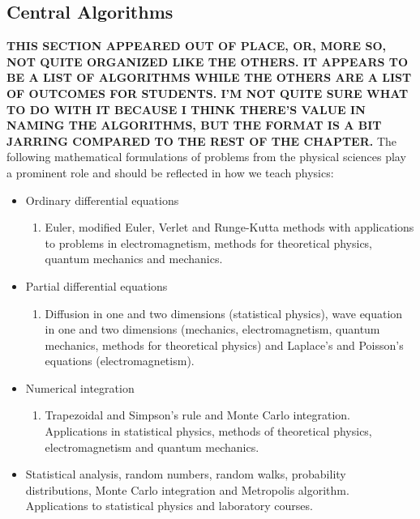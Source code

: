 \documentclass[graybox,envcountchap,sectrefs]{svmult}
\begin{document}
\subsection{Central Algorithms}
{\bf THIS SECTION APPEARED OUT OF PLACE, OR, MORE SO, NOT QUITE ORGANIZED LIKE THE OTHERS. IT APPEARS TO BE A LIST OF ALGORITHMS WHILE THE OTHERS ARE A LIST OF OUTCOMES FOR STUDENTS. I'M NOT QUITE SURE WHAT TO DO WITH IT BECAUSE I THINK THERE'S VALUE IN NAMING THE ALGORITHMS, BUT THE FORMAT IS A BIT JARRING COMPARED TO THE REST OF THE CHAPTER.}
The following mathematical formulations of problems from the physical sciences play a prominent role and should be reflected in how we teach physics:
\begin{itemize}
\item Ordinary differential equations
\begin{enumerate}

  \item Euler, modified Euler, Verlet and Runge-Kutta methods with applications to problems in electromagnetism, methods for theoretical physics, quantum mechanics and mechanics.

\end{enumerate}


\item Partial differential equations
\begin{enumerate}

  \item Diffusion in one and two dimensions (statistical physics), wave equation in one and two dimensions (mechanics, electromagnetism, quantum mechanics, methods for theoretical physics) and Laplace's and Poisson's equations (electromagnetism).

\end{enumerate}


\item Numerical integration
\begin{enumerate}

  \item Trapezoidal and Simpson's rule and Monte Carlo integration. Applications in statistical physics, methods of theoretical physics, electromagnetism and quantum mechanics.

\end{enumerate}


\item Statistical analysis, random numbers, random walks, probability distributions, Monte Carlo integration and Metropolis algorithm. Applications to statistical physics and laboratory courses.


\end{itemize}
\end{document}
